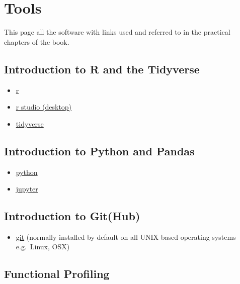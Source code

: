 \documentclass[
  letterpaper,
]{book}
\providecommand{\tightlist}{%
  \setlength{\itemsep}{0pt}\setlength{\parskip}{0pt}}\usepackage{longtable,booktabs,array}
\begin{document}
\hypertarget{tools}{%
\chapter{Tools}\label{tools}}

This page all the software with links used and referred to in the
practical chapters of the book.

\hypertarget{introduction-to-r-and-the-tidyverse-1}{%
\section{Introduction to R and the
Tidyverse}\label{introduction-to-r-and-the-tidyverse-1}}

\begin{itemize}
\tightlist
\item
  \href{https://www.r-project.org/}{r}
\item
  \href{https://www.rstudio.com/products/rstudio/}{r studio (desktop)}
\item
  \href{https://www.tidyverse.org/}{tidyverse}
\end{itemize}

\hypertarget{introduction-to-python-and-pandas-1}{%
\section{Introduction to Python and
Pandas}\label{introduction-to-python-and-pandas-1}}

\begin{itemize}
\tightlist
\item
  \href{https://www.python.org/}{python}
\item
  \href{https://jupyter.org/}{jupyter}
\end{itemize}

\hypertarget{introduction-to-github-1}{%
\section{Introduction to Git(Hub)}\label{introduction-to-github-1}}

\begin{itemize}
\tightlist
\item
  \href{https://git-scm.com/}{git} (normally installed by default on all
  UNIX based operating systems e.g.~Linux, OSX)
\end{itemize}

\hypertarget{functional-profiling-2}{%
\section{Functional Profiling}\label{functional-profiling-2}}
\end{document}
